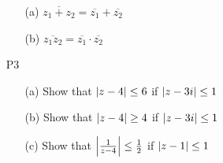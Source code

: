 \documentclass{article}
\begin{document}
\begin{itemize}
    \begin{itemize}
        \item [(a)] $\overline{z_1+z_2}=\overline{z_1}+\overline{z_2}$
        \item [(b)] $\overline{z_1z_2}=\overline{z_1}\cdot\overline{z_2}$
    \end{itemize}
    \item [P3]
    \begin{itemize}
        \item [(a)] Show that $\abs{z-4}\leq 6$ if $\abs{z-3i}\leq 1$
        \item [(b)] Show that $\abs{z-4}\geq 4$ if $\abs{z-3i}\leq 1$
        \item [(c)] Show that $\abs{\frac{1}{z-4}}\leq\frac{1}{2}$ if $\abs{z-1}\leq 1$
    \end{itemize}
\end{itemize}
\end{document}
